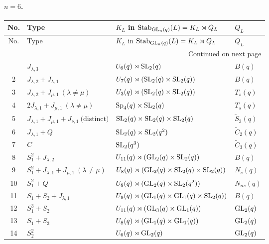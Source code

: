 \paragraph{$n=6$.}
\begin{longtable}{@{}c p{} p{} p{}@{}}
\toprule
No. & Type & $K_L$ in $\mathrm{Stab}_{\mathrm{GL}_n(q)}(L)=K_L\rtimes Q_L$ & $Q_L$ \\
\midrule
\endfirsthead
\toprule
No. & Type & $K_L$ in $\mathrm{Stab}_{\mathrm{GL}_n(q)}(L)=K_L\rtimes Q_L$ & $Q_L$ \\
\midrule
\endhead
\midrule
\multicolumn{4}{r}{Continued on next page}\\
\midrule
\endfoot
\bottomrule
\endlastfoot
1 & \(J_{\lambda,3}\) & $U_6(q)\rtimes \mathrm{SL}_2(q)$ & $B(q)$ \\
2 & \(J_{\lambda,2} + J_{\lambda,1}\) & $U_7(q)\rtimes (\mathrm{SL}_2(q)\times \mathrm{SL}_2(q))$ & $B(q)$ \\
3 & \(J_{\lambda,2} + J_{\mu,1}\ (\lambda \ne \mu)\) & $U_3(q)\rtimes (\mathrm{SL}_2(q)\times \mathrm{SL}_2(q))$ & $T_s(q)$ \\
4 & \(2J_{\lambda,1} + J_{\mu,1}\ (\lambda \ne \mu)\) & $\mathrm{Sp}_4(q)\times \mathrm{SL}_2(q)$ & $T_s(q)$ \\
5 & \(J_{\lambda,1} + J_{\mu,1} + J_{\nu,1}\ \text{(distinct)}\) & $\mathrm{SL}_2(q)\times \mathrm{SL}_2(q)\times \mathrm{SL}_2(q)$ & $\widetilde{S}_3(q)$ \\
6 & \(J_{\lambda,1} + Q\) & $\mathrm{SL}_2(q)\times \mathrm{SL}_2(q^2)$ & $\widetilde{C}_2(q)$ \\
7 & \(C\) & $\mathrm{SL}_2(q^3)$ & $\widetilde{C}_3(q)$ \\
8 & \(S_1^2 + J_{\lambda,2}\) & $U_{11}(q)\rtimes (\mathrm{GL}_2(q)\times \mathrm{SL}_2(q))$ & $B(q)$ \\
9 & \(S_1^2 + J_{\lambda,1} + J_{\mu,1}\ (\lambda \ne \mu)\) & $U_8(q)\rtimes (\mathrm{GL}_2(q)\times \mathrm{SL}_2(q)\times \mathrm{SL}_2(q))$ & $N_s(q)$ \\
10 & \(S_1^2 + Q\) & $U_8(q)\rtimes (\mathrm{GL}_2(q)\times \mathrm{SL}_2(q^2))$ & $N_{ns}(q)$ \\
11 & \(S_1 + S_2 + J_{\lambda,1}\) & $U_9(q)\rtimes (\mathrm{GL}_1(q)\times \mathrm{GL}_1(q)\times \mathrm{SL}_2(q))$ & $B(q)$ \\
12 & \(S_1^3 + S_2\) & $U_{11}(q)\rtimes (\mathrm{GL}_3(q)\times \mathrm{GL}_1(q))$ & $\mathrm{GL}_2(q)$ \\
13 & \(S_1 + S_3\) & $U_8(q)\rtimes (\mathrm{GL}_1(q)\times \mathrm{GL}_1(q))$ & $\mathrm{GL}_2(q)$ \\
14 & \(S_2^2\) & $U_6(q)\rtimes \mathrm{GL}_2(q)$ & $\mathrm{GL}_2(q)$ \\
\end{longtable}

